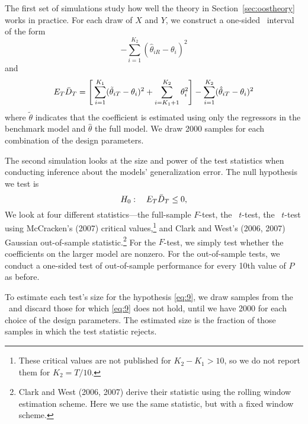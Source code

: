 \documentclass[11pt]{article}
\begin{document}
The first set of simulations study how well the theory in
Section~\ref{sec:oostheory} works in practice.  For each draw of $X$
and $Y$, we construct a one-sided \oos\ interval of the
form
\begin{equation*}
  [ \oosA - 1.28 \hat{\sigma}, \infty) \quad\text{with}\quad
  \sh^2 = \frac1P \sum_{t=R+1}^T (D_t - \oosA)^{2}
\end{equation*}
for $P$ set to every 10th value between 1 and $2T/3$.  We calculate
the percentage of these intervals that contain $\E_R \oosA$ and that
contain $\E_T \oosB$.  Since the data are i.i.d., both of these
quantities are easy to calculate:
\begin{equation*}
  E_R \oosA = \Bigg[\sum_{i=1}^{K_1} (\tilde{\theta}_{iR} - \theta_i)^2 +
  \sum_{i=K_1+1}^{K_2}\theta_i^2\Bigg] - \sum_{i=1}^{K_2} (\hat{\theta}_{iR} -
  \theta_i)^2
\end{equation*}
and
\begin{equation*}
  E_T \bar{D}_{T} = \Bigg[\sum_{i=1}^{K_1} (\tilde{\theta}_{iT} - \theta_i)^2 +
  \sum_{i=K_1+1}^{K_2}\theta_i^2\Bigg] - \sum_{i=1}^{K_2} (\hat{\theta}_{iT} -
  \theta_i)^2
\end{equation*}
where $\tilde{\theta}$ indicates that the coefficient is estimated
using only the regressors in the benchmark model and $\hat{\theta}$
the full model.  We draw 2000 samples for each combination of the
design parameters.

The second simulation looks at the size and power of the test
statistics when conducting inference about the models' generalization
error.  The null hypothesis we test is
\begin{equation}\label{eq:9}
  H_0:\quad E_T \bar{D}_{T} \leq 0,
\end{equation}
We look at four different statistics---the full-sample $F$-test, the
\dmw\ $t$-test, the
\oos\ $t$-test using McCracken's (2007)
critical values,\footnote{These critical values are not published for
  $K_2-K_1>10$, so we do not report them for $K_2 = T/10$.}
and Clark and West's (2006, 2007) Gaussian out-of-sample
statistic.\footnote{Clark and West (2006, 2007) derive their statistic
using the rolling window estimation scheme.  Here we use the same
statistic, but with a fixed window scheme.}
For the $F$-test, we simply test whether the coefficients on the larger
model are nonzero.  For the out-of-sample tests, we conduct a
one-sided test of out-of-sample performance for every 10th value of
$P$ as before.

To estimate each test's size for the hypothesis \eqref{eq:9}, we draw
samples from the \dgp\ and discard those for which \eqref{eq:9} does
not hold, until we have 2000 for each choice of the design parameters.
The estimated size is the fraction of those samples in which the test
statistic rejects.
\end{document}
